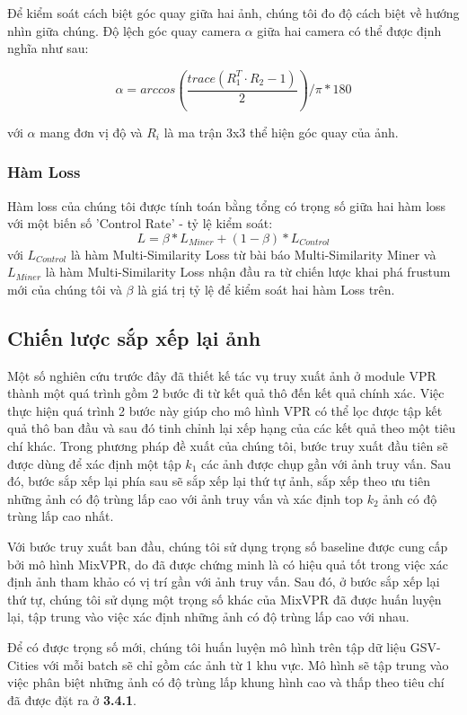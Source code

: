 Để kiểm soát cách biệt góc quay giữa hai ảnh, chúng tôi đo độ cách biệt về hướng nhìn giữa chúng. Độ lệch góc quay camera $\alpha$ giữa hai camera có thể được định nghĩa như sau:

$$
\alpha = arccos\left(\frac{trace(R_1^T \cdot R_2 - 1)}{2} \right) / \pi * 180
$$

với $\alpha$ mang đơn vị độ và $R_i$ là ma trận 3x3 thể hiện góc quay của ảnh.

\subsubsection*{Hàm Loss}

Hàm loss của chúng tôi được tính toán bằng tổng có trọng số giữa hai hàm loss với một biến số 'Control Rate' - tỷ lệ kiểm soát:
$$
L = \beta * L_{Miner} + (1-\beta)*L_{Control}
$$
với $L_{Control}$ là hàm Multi-Similarity Loss từ bài báo Multi-Similarity Miner và $L_{Miner}$ là hàm Multi-Similarity Loss nhận đầu ra từ chiến lược khai phá frustum mới của chúng tôi và $\beta$ là giá trị tỷ lệ để kiểm soát hai hàm Loss trên.

\subsection{Chiến lược sắp xếp lại ảnh}
Một số nghiên cứu trước đây đã thiết kế tác vụ truy xuất ảnh ở module VPR thành một quá trình gồm 2 bước đi từ kết quả thô đến kết quả chính xác. Việc thực hiện quá trình 2 bước này giúp cho mô hình VPR có thể lọc được tập kết quả thô ban đầu và sau đó tinh chỉnh lại xếp hạng của các kết quả theo một tiêu chí khác. Trong phương pháp đề xuất của chúng tôi, bước truy xuất đầu tiên sẽ được dùng để xác định một tập $k_1$ các ảnh được chụp gần với ảnh truy vấn. Sau đó, bước sắp xếp lại phía sau sẽ sắp xếp lại thứ tự ảnh, sắp xếp theo ưu tiên những ảnh có độ trùng lấp cao với ảnh truy vấn và xác định top $k_2$ ảnh có độ trùng lấp cao nhất.

Với bước truy xuất ban đầu, chúng tôi sử dụng trọng số baseline được cung cấp bởi mô hình MixVPR, do đã được chứng minh là có hiệu quả tốt trong việc xác định ảnh tham khảo có vị trí gần với ảnh truy vấn. Sau đó, ở bước sắp xếp lại thứ tự, chúng tôi sử dụng một trọng số khác của MixVPR đã được huấn luyện lại, tập trung vào việc xác định những ảnh có độ trùng lấp cao với nhau. 

Để có được trọng số mới, chúng tôi huấn luyện mô hình trên tập dữ liệu GSV-Cities \cite{Ali_bey_2022} với mỗi batch sẽ chỉ gồm các ảnh từ 1 khu vực. Mô hình sẽ tập trung vào việc phân biệt những ảnh có độ trùng lấp khung hình cao và thấp theo tiêu chí đã được đặt ra ở \textbf{3.4.1}.

